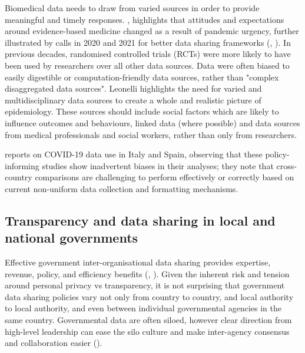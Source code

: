 \documentclass{CUP-JNL-DAP}%
\begin{document}
Biomedical data needs to draw from varied sources in order to provide meaningful and timely responses. \cite{leonelli_2023}, highlights that attitudes and expectations around evidence-based medicine changed as a result of pandemic urgency, further illustrated by calls in 2020 and 2021 for better data sharing frameworks (\cite{buckee_aggregated_2020}, \cite{xu_epidemiological_2020}). In previous decades, randomised controlled trials (RCTs) were more likely to have been used by researchers over all other data sources. Data were often biased to easily digestible or computation-friendly data sources, rather than "complex disaggregated data sources". Leonelli highlights the need for varied and multidisciplinary data sources to create a whole and realistic picture of epidemiology. These sources should include social factors which are likely to influence outcomes and behaviours, linked data (where possible) and data sources from medical professionals and social workers, rather than only from researchers. 

\cite{starnini_impact_2021} reports on COVID-19 data use in Italy and Spain, observing that these policy-informing studies show inadvertent biases in their analyses; they note that cross-country comparisons are challenging to perform effectively or correctly based on current non-uniform data collection and formatting mechanisms. 

\subsection{Transparency and data sharing in local and national governments}

Effective government inter-organisational data sharing provides expertise, revenue, policy, and efficiency benefits (\cite{gil-garcia_government_2016}, \cite{ramon_gil-garcia_collaborative_2007}). Given the inherent risk and tension around personal privacy vs transparency, it is not surprising that government data sharing policies vary not only from country to country, and local authority to local authority, and even between individual governmental agencies in the same country. Governmental data are often siloed, however clear direction from high-level leadership can ease the silo culture and make inter-agency consensus and collaboration easier (\cite{graham_navigating_2016}). 
\end{document}

